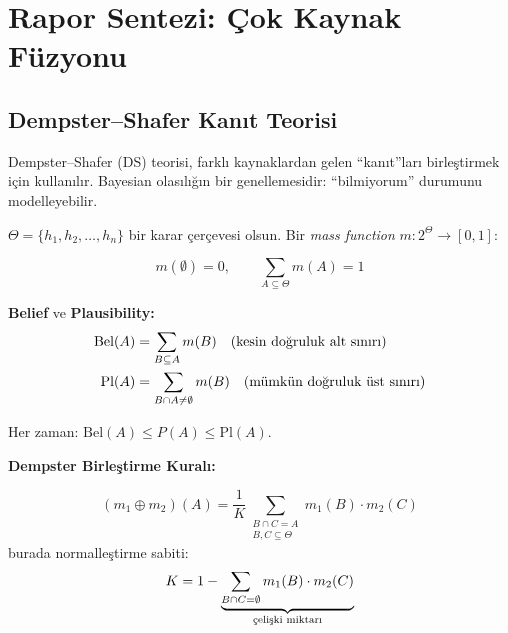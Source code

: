 \section{Rapor Sentezi: \c{C}ok Kaynak F\"{u}zyonu}
\label{sec:report_synthesis}

\subsection{Dempster--Shafer Kan{\i}t Teorisi}

Dempster--Shafer (DS) teorisi, farkl{\i} kaynaklardan gelen ``kan{\i}t''lar{\i} birle\c{s}tirmek i\c{c}in kullan{\i}l{\i}r. Bayesian olas{\i}l{\i}\u{g}{\i}n bir genellemesidir: ``bilmiyorum'' durumunu modelleyebilir.

$\Theta = \{h_1, h_2, \ldots, h_n\}$ bir karar \c{c}er\c{c}evesi olsun. Bir \emph{mass function} $m : 2^{\Theta} \to [0,1]$:

\begin{equation}
\label{eq:ds_mass}
m(\emptyset) = 0, \qquad \sum_{A \subseteq \Theta} m(A) = 1
\end{equation}

\textbf{Belief} ve \textbf{Plausibility:}
\begin{align}
\text{Bel}(A) &= \sum_{B \subseteq A} m(B) \quad \text{(kesin do\u{g}ruluk alt s{\i}n{\i}r{\i})} \label{eq:belief} \\
\text{Pl}(A)  &= \sum_{B \cap A \neq \emptyset} m(B) \quad \text{(m\"{u}mk\"{u}n do\u{g}ruluk \"{u}st s{\i}n{\i}r{\i})} \label{eq:plausibility}
\end{align}

Her zaman: $\text{Bel}(A) \leq P(A) \leq \text{Pl}(A)$.

\textbf{Dempster Birle\c{s}tirme Kural{\i}:}
\begin{formulbox}
\begin{equation}
\label{eq:dempster_rule}
(m_1 \oplus m_2)(A) = \frac{1}{K} \sum_{\substack{B \cap C = A \\ B,C \subseteq \Theta}} m_1(B) \cdot m_2(C)
\end{equation}
burada normalle\c{s}tirme sabiti:
\begin{equation}
\label{eq:dempster_K}
K = 1 - \underbrace{\sum_{B \cap C = \emptyset} m_1(B) \cdot m_2(C)}_{\text{\c{c}eli\c{s}ki miktar{\i}}}
\end{equation}
\end{formulbox}


